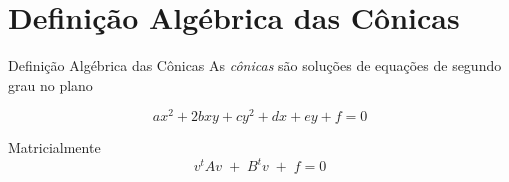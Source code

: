 \documentclass[fleqn,aspectratio=169,12pt]{beamer}
\begin{document}
\section{Definição Algébrica das Cônicas}

\begin{frame}{Definição Algébrica das Cônicas}
  As \emph{cônicas} são soluções de equações de segundo grau no plano

  \pause
  \[
    ax^2 + 2bxy + cy^2 + dx + ey + f = 0
  \]

  \pause
  Matricialmente
  \[
    v^tAv \;+\; B^tv \;+\; f = 0
  \]
\end{frame}

%
%

\end{document}
